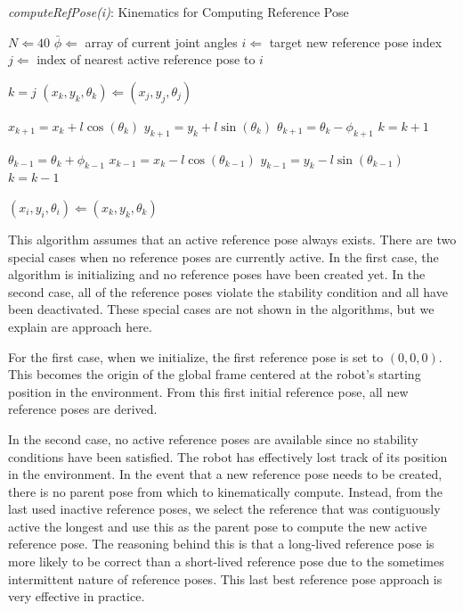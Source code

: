 \begin{algorithm}
\caption{\emph{computeRefPose(i)}: Kinematics for Computing Reference Pose}
\label{alg:kinematic}
\begin{algorithmic}

\State $N \Leftarrow 40$
\State $\bar{\phi} \Leftarrow $ array of current joint angles 
\State $i \Leftarrow $ target new reference pose index
\State $j \Leftarrow $ index of nearest active reference pose to $i$

\State $k = j$
\State $(x_k, y_k, \theta_k) \Leftarrow (x_j, y_j, \theta_j)$  


\State $x_{k+1} = x_k + l \cos(\theta_k)$
\State $y_{k+1} = y_k + l \sin(\theta_k)$
\State $\theta_{k+1} = \theta_k - \phi_{k+1}$
\State $k = k + 1$
\EndWhile


\State $\theta_{k-1} = \theta_k + \phi_{k-1}$
\State $x_{k-1} = x_k - l \cos(\theta_{k-1})$
\State $y_{k-1} = y_k - l \sin(\theta_{k-1})$
\State $k = k - 1$

\EndWhile
\EndIf

\State $(x_i, y_i, \theta_i) \Leftarrow (x_k, y_k, \theta_k)$ 

\end{algorithmic}
\end{algorithm}

This algorithm assumes that an active reference pose always exists.  There are two special cases when no reference poses are currently active.   In the first case, the algorithm is initializing and no reference poses have been created yet.  In the second case, all of the reference poses violate the stability condition and all have been deactivated.  These special cases are not shown in the algorithms, but we explain are approach here.

For the first case, when we initialize, the first reference pose is set to $(0,0,0)$.  This becomes the origin of the global frame centered at the robot's starting position in the environment.  From this first initial reference pose, all new reference poses are derived. 

In the second case, no active reference poses are available since no stability conditions have been satisfied.  The robot has effectively lost track of its position in the environment.  In the event that a new reference pose needs to be created, there is no parent pose from which to kinematically compute.  Instead, from the last used inactive reference poses, we select the reference that was contiguously active the longest and use this as the parent pose to compute the new active reference pose.  The reasoning behind this is that a long-lived reference pose is more likely to be correct than a short-lived reference pose due to the sometimes intermittent nature of reference poses.  This last best reference pose approach is very effective in practice.  

